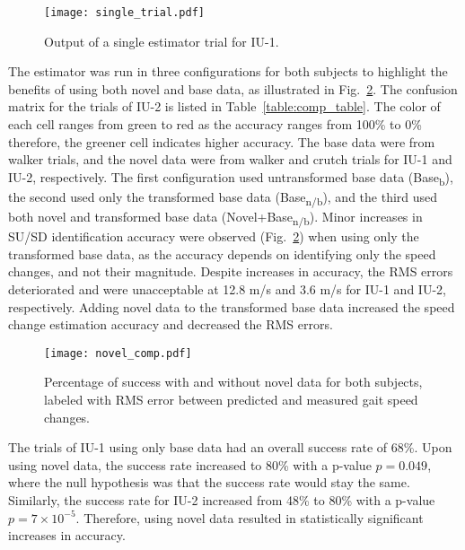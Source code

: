 \begin{figure}
	\centering
	\texttt{[image: single\_trial.pdf]}
	\caption{Output of a single estimator trial for IU-1.}\label{fig:single_trial}
\end{figure}

The  estimator was run in three configurations for both subjects to highlight the benefits of using both novel and base data, as illustrated in Fig.~\ref{fig:novel_comp}. The confusion matrix for the trials of IU-2 is listed in Table~\ref{table:comp_table}. The color of each cell ranges from green to red as the accuracy ranges from 100\% to 0\% therefore, the greener cell indicates higher accuracy. The base data were from walker trials, and the novel data were from walker and crutch trials for IU-1 and IU-2, respectively. The first configuration used untransformed base data (Base\textsubscript{b}), the second used only the transformed base data (Base\textsubscript{n/b}), and the third used both novel and transformed base data (Novel+Base\textsubscript{n/b}). Minor increases in SU/SD identification accuracy were observed (Fig.~\ref{fig:novel_comp}) when using only the transformed base data, as the accuracy depends on identifying only the speed changes, and not their magnitude. Despite increases in accuracy, the RMS errors deteriorated and were unacceptable at 12.8 m/s and 3.6 m/s for IU-1 and IU-2, respectively. Adding novel data to the transformed base data increased the speed change estimation accuracy and decreased the RMS errors. 

\begin{figure}
	\centering
	\texttt{[image: novel\_comp.pdf]}
	\caption{Percentage of success with and without novel data for both subjects, labeled with RMS error between predicted and measured gait speed changes.}\label{fig:novel_comp}
\end{figure}

\begin{table}
	\centering
	\caption{Confusion matrix for IU-2 \\ For estimation with and without novel data }\label{table:comp_table}
	
\end{table}

The trials of IU-1 using only base data had an overall success rate of 68\%. Upon using novel data, the success rate increased to 80\% with a p-value $ p = 0.049$, where the null hypothesis was that the success rate would stay the same. Similarly, the success rate for IU-2 increased from 48\% to 80\% with a p-value $ p = 7\times10^{-5} $. Therefore, using novel data resulted in statistically significant increases in accuracy.

